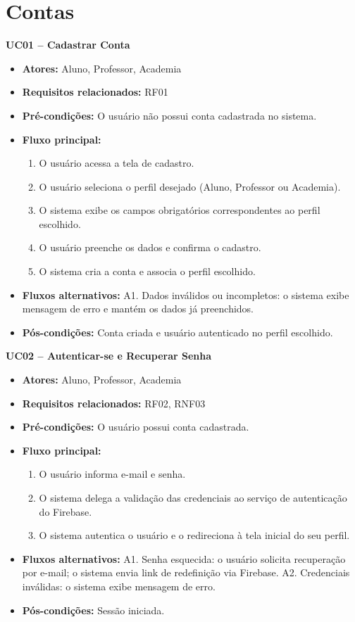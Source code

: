 \section*{Contas}

\noindent\textbf{UC01 -- Cadastrar Conta}
\begin{itemize}[leftmargin=*, itemsep=0pt, topsep=2pt]
  \item \textbf{Atores:} Aluno, Professor, Academia
  \item \textbf{Requisitos relacionados:} RF01
  \item \textbf{Pré-condições:} O usuário não possui conta cadastrada no sistema.
  \item \textbf{Fluxo principal:}
  \begin{enumerate}[label=\arabic*., itemsep=0pt, topsep=0pt]
    \item O usuário acessa a tela de cadastro.
    \item O usuário seleciona o perfil desejado (Aluno, Professor ou Academia).
    \item O sistema exibe os campos obrigatórios correspondentes ao perfil escolhido.
    \item O usuário preenche os dados e confirma o cadastro.
    \item O sistema cria a conta e associa o perfil escolhido.
  \end{enumerate}
  \item \textbf{Fluxos alternativos:} A1. Dados inválidos ou incompletos: o sistema exibe mensagem de erro e mantém os dados já preenchidos.
  \item \textbf{Pós-condições:} Conta criada e usuário autenticado no perfil escolhido.
\end{itemize}
\medskip

\noindent\textbf{UC02 -- Autenticar-se e Recuperar Senha}
\begin{itemize}[leftmargin=*, itemsep=0pt, topsep=2pt]
  \item \textbf{Atores:} Aluno, Professor, Academia
  \item \textbf{Requisitos relacionados:} RF02, RNF03
  \item \textbf{Pré-condições:} O usuário possui conta cadastrada.
  \item \textbf{Fluxo principal:}
  \begin{enumerate}[label=\arabic*., itemsep=0pt, topsep=0pt]
    \item O usuário informa e-mail e senha.
    \item O sistema delega a validação das credenciais ao serviço de autenticação do Firebase.
    \item O sistema autentica o usuário e o redireciona à tela inicial do seu perfil.
  \end{enumerate}
  \item \textbf{Fluxos alternativos:} A1. Senha esquecida: o usuário solicita recuperação por e-mail; o sistema envia link de redefinição via Firebase. A2. Credenciais inválidas: o sistema exibe mensagem de erro.
  \item \textbf{Pós-condições:} Sessão iniciada.
\end{itemize}
\medskip

